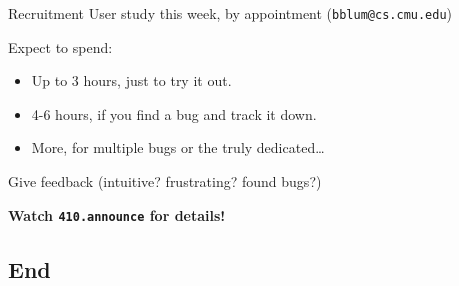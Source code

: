 \documentclass[xcolor=dvipsnames]{beamer}
\begin{document}
\begin{frame}{Recruitment}
	User study this week, by appointment (\texttt{bblum@cs.cmu.edu})

	\linegap
	Expect to spend:
	\begin{itemize}
		\item Up to 3 hours, just to try it out.
		\item 4-6 hours, if you find a bug and track it down.
		\item More, for multiple bugs or the truly dedicated\ldots
	\end{itemize}
	\linegap

	Give feedback (intuitive? frustrating? found bugs?)

	\linegap
	{\bf Watch \texttt{410.announce} for details!}
\end{frame}

\subsection{End}



% 
\end{document}

